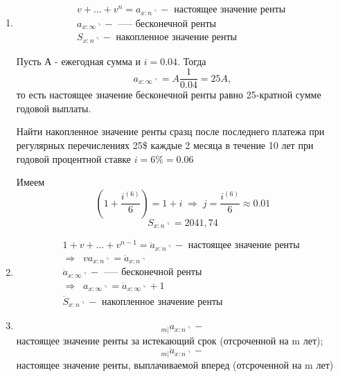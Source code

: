 \begin{enumerate}
	\item {}

	\begin{gather*}
		v + ... + v^n = a_{x:n\urcorner} - \text{ настоящее значение ренты }\\
		a_{x:\infty\urcorner} - \text{ ----- бесконечной ренты}\\
		S_{x:n\urcorner} - \text{ накопленное значение ренты }
	\end{gather*}

	\begin{example}
		Пусть А - ежегодная сумма и $ i = 0.04$. Тогда 
		\[  a_{x:\infty\urcorner} = A \frac{1}{0.04}=25A,\]
		то есть настоящее значение бесконечной ренты равно 25-кратной сумме годовой выплаты.
	\end{example}

	\begin{example}
		Найти накопленное значение ренты сразц после последнего платежа при регулярных перечислениях 25\$ каждые 2 месяца в течение 10 лет при годовой процентной ставке $ i = 6\% = 0.06$

		Имеем
		\[ (1+\frac{i^{(6)}}{6}) = 1+i \;\Rightarrow\; j = \frac{i^{(6)}}{6} \approx 0.01\]
		\[ S_{x:n\urcorner} = 2041, 74\]
	\end{example}

	\item {}

	\begin{gather*}
		1+v + ... + v^{n-1} = \ddot{a}_{x:n\urcorner} - \text{ настоящее значение ренты }\\
		\Rightarrow\;\; v a_{x:n\urcorner} = \ddot{a}_{x:n\urcorner}\\
		\ddot{a}_{x:\infty\urcorner} - \text{ ----- бесконечной ренты}\\
		\Rightarrow\;\; {a}_{x:\infty\urcorner} = \ddot{a}_{x:\infty\urcorner} + 1\\
		\ddot{S}_{x:n\urcorner} - \text{ накопленное значение ренты }
	\end{gather*}

	\item {}

	\[{}_{m|}a_{x:n\urcorner}- \]
	настоящее значение ренты за истекающий срок (отсроченной на m лет);
	\[ {}_{m|}\ddot{a}_{x:n\urcorner}- \]
	настоящее значение ренты, выплачиваемой вперед (отсроченной на m лет)


\end{enumerate}
